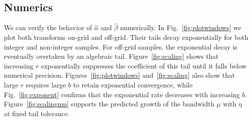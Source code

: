 \documentclass[aps,floatfix,10pt,amssymb,amsfont,amsmath,superscriptaddress,float,nofootinbib,longbibliography,nobalancelastpage,twocolumn]{revtex4-2}
\begin{document}
\subsection{Numerics}
We can verify the behavior of $\hat \alpha$ and $\hat \beta$ numerically. In Fig.~\ref{fig:plotwindows} we plot both transforms on-grid and off-grid. Their tails decay exponentially for both integer and non-integer samples. For off-grid samples, the exponential decay is eventually overtaken by an algebraic tail. Figure~\ref{fig:scaling} shows that increasing $r$ exponentially suppresses the coefficient of this tail until it falls below numerical precision. Figures~\ref{fig:plotwindows} and~\ref{fig:scaling} also show that large $r$ requires large $b$ to retain exponential convergence, while Fig.~\ref{fig:exponent} confirms that the exponential rate decreases with increasing $b$. Figure~\ref{fig:scalingmu} supports the predicted growth of the bandwidth $\mu$ with $\eta$ at fixed tail tolerance. 
\end{document}
